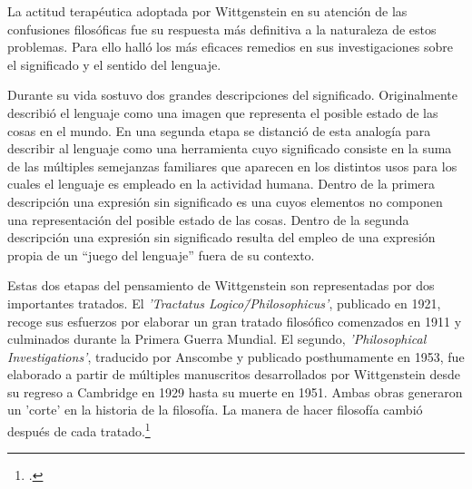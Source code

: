 La actitud terapéutica adoptada por Wittgenstein en su atención de las
confusiones filosóficas fue su respuesta más definitiva a la naturaleza de estos
problemas. Para ello halló los más eficaces remedios en sus investigaciones sobre el
significado y el sentido del lenguaje.

Durante su vida sostuvo dos grandes descripciones del significado.
Originalmente describió el lenguaje como una imagen que representa el posible
estado de las cosas en el mundo.
En una segunda etapa se distanció de esta analogía para describir al lenguaje
como una herramienta cuyo significado consiste en la suma de las múltiples
semejanzas familiares que aparecen en los distintos usos para los cuales el
lenguaje es empleado en la actividad humana.
Dentro de la primera descripción una expresión sin significado es una cuyos
elementos no componen una representación del posible estado de las cosas.
Dentro de la segunda descripción una expresión sin significado resulta del
empleo de una expresión propia de un ``juego del lenguaje'' fuera de su
contexto. 

Estas dos etapas del pensamiento de Wittgenstein 
son representadas por dos importantes tratados. 
El \emph{'Tractatus Logico\=/Philosophicus'}, publicado en 1921, recoge sus
esfuerzos por elaborar un gran tratado filosófico comenzados en 1911 y
culminados durante la Primera Guerra Mundial. El segundo, \emph{'Philosophical 
    Investigations'}, traducido por Anscombe y publicado posthumamente en 1953,
fue elaborado a partir de múltiples manuscritos desarrollados por Wittgenstein
desde su regreso a Cambridge en 1929 hasta su muerte en 1951. 
Ambas obras generaron un 'corte' en la historia de la filosofía. La manera de
hacer filosofía cambió después de cada tratado.\footcite[cf.~][p.~181]{twocuts}



